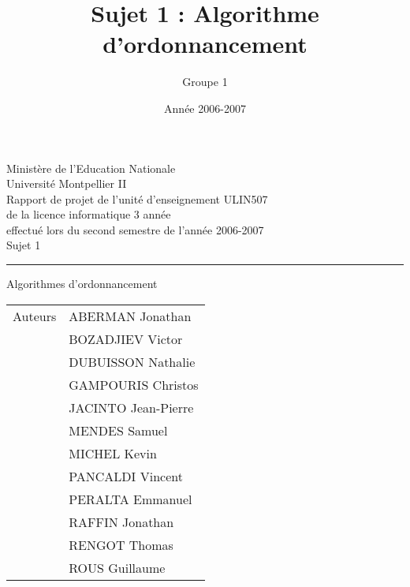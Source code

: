 \documentclass[A4]{report}
\title{Sujet 1 : Algorithme d'ordonnancement}
\author{Groupe 1}
\date{Année 2006-2007}
\theoremstyle{remark}
\newcommand{\sups}[1]{\raisebox{1ex}{\small #1}}
\begin{document}
\begin{titlepage}
\begin{center}
{\large
Ministère de l'Education Nationale \\
\vspace{0.8cm}
Université Montpellier II \\
\vspace{1.5cm}
Rapport de projet de l'unité d'enseignement ULIN507 \\
de la licence informatique 3\sups{ème} année \\
effectué lors du second semestre de l'année 2006-2007 \\
}
\vspace{4cm}
{\huge Sujet 1 }\\
\vspace{0.2cm}
\hrule
\vspace{0.2cm}
{\Huge Algorithmes d'ordonnancement}
\vspace{7cm}
\end{center}
\begin{flushright}
{\raggedleft
\begin{tabular}{r|l}
Auteurs & ABERMAN Jonathan \\
& BOZADJIEV Victor \\
& DUBUISSON Nathalie \\
& GAMPOURIS Christos \\
& JACINTO Jean-Pierre \\
& MENDES Samuel \\
& MICHEL Kevin \\
& PANCALDI Vincent \\
& PERALTA Emmanuel \\
& RAFFIN Jonathan \\
& RENGOT Thomas \\
& ROUS Guillaume \\
\end{tabular}
}
\end{flushright}
\end{titlepage}
\tableofcontents







\end{document}
